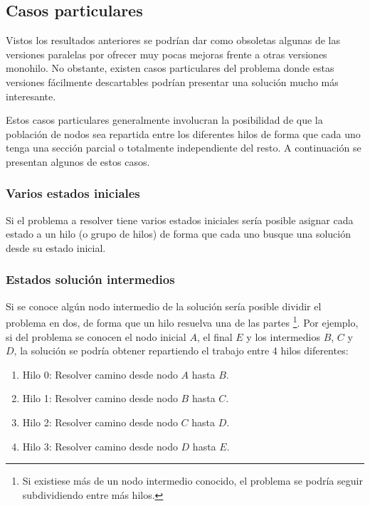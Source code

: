 \subsection{Casos particulares}

Vistos los resultados anteriores
se podrían dar como obsoletas algunas de las versiones
paralelas por ofrecer muy pocas mejoras frente a otras
versiones monohilo.
No obstante, existen casos particulares del problema
donde estas versiones fácilmente descartables
podrían presentar una solución mucho más interesante.

Estos casos particulares generalmente involucran
la posibilidad de que la población de nodos sea
repartida entre los diferentes hilos de forma
que cada uno tenga una sección parcial o totalmente
independiente del resto.
A continuación se presentan algunos de estos casos.

\subsubsection{Varios estados iniciales}

Si el problema a resolver tiene varios estados iniciales
sería posible asignar cada estado a un hilo (o grupo de hilos)
de forma que cada uno busque una solución desde su estado inicial.

\subsubsection{Estados solución intermedios}

Si se conoce algún nodo intermedio de la solución
sería posible dividir el problema en dos,
de forma que un hilo resuelva una de las partes
\footnote{Si existiese más de un nodo intermedio conocido,
el problema se podría seguir subdividiendo entre más hilos.}.
Por ejemplo, si del problema se conocen el nodo inicial $A$,
el final $E$ y los intermedios $B$, $C$ y $D$,
la solución se podría obtener repartiendo el
trabajo entre 4 hilos diferentes:
\begin{enumerate}[itemsep=0.25px]
    \item Hilo 0: Resolver camino desde nodo $A$ hasta $B$.
    \item Hilo 1: Resolver camino desde nodo $B$ hasta $C$.
    \item Hilo 2: Resolver camino desde nodo $C$ hasta $D$.
    \item Hilo 3: Resolver camino desde nodo $D$ hasta $E$.
\end{enumerate}

